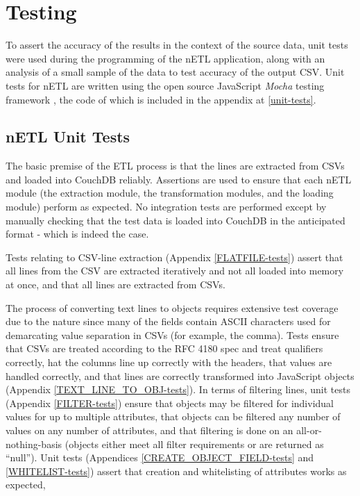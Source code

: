 \section{Testing}
To assert the accuracy of the results in the context of the source data, unit tests were used during the programming of the nETL application, along with an analysis of a small sample of the data to test accuracy of the output CSV. Unit tests for nETL are written using the open source JavaScript \textit{Mocha} testing framework \cite{mochaTest}, the code of which is included in the appendix at \ref{unit-tests}.

\subsection{nETL Unit Tests}
The basic premise of the ETL process is that the lines are extracted from CSVs and loaded into CouchDB reliably. Assertions are used to ensure that each nETL module (the extraction module, the transformation modules, and the loading module) perform as expected. No integration tests are performed except by manually checking that the test data is loaded into CouchDB in the anticipated format - which is indeed the case.

Tests relating to CSV-line extraction (Appendix \ref{FLATFILE-tests}) assert that all lines from the CSV are extracted iteratively and not all loaded into memory at once, and that all lines are extracted from CSVs.

The process of converting text lines to objects requires extensive test coverage due to the nature since many of the fields contain ASCII characters used for demarcating value separation in CSVs (for example, the comma). Tests ensure that CSVs are treated according to the RFC 4180 spec and treat qualifiers correctly, hat the columns line up correctly with the headers, that values are handled correctly, and that lines are correctly transformed into JavaScript objects (Appendix \ref{TEXT_LINE_TO_OBJ-tests}). In terms of filtering lines, unit tests (Appendix \ref{FILTER-tests}) ensure that objects may be filtered for individual values for up to multiple attributes, that objects can be filtered any number of values on any number of attributes, and that filtering is done on an all-or-nothing-basis (objects either meet all filter requirements or are returned as ``null''). Unit tests (Appendices \ref{CREATE_OBJECT_FIELD-tests} and \ref{WHITELIST-tests}) assert that creation and whitelisting of attributes works as expected,

